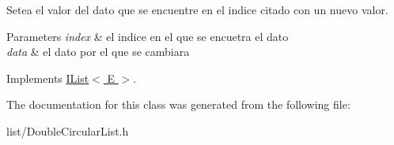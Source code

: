 Setea el valor del dato que se encuentre en el indice citado con un nuevo valor. 


\begin{DoxyParams}{Parameters}
{\em index} & el indice en el que se encuetra el dato \\
\hline
{\em data} & el dato por el que se cambiara \\
\hline
\end{DoxyParams}


Implements \hyperlink{class_i_list_a119ed658d2804aec0b9fef9325c03073}{I\-List$<$ E $>$}.



The documentation for this class was generated from the following file\-:\begin{DoxyCompactItemize}
\item 
list/Double\-Circular\-List.\-h\end{DoxyCompactItemize}
